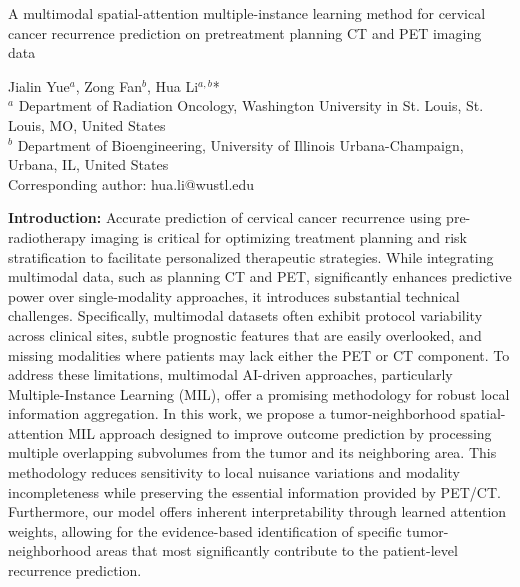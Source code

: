 \documentclass[a4paper]{article}
\begin{document}

\Large
 \begin{center}
A multimodal spatial-attention multiple-instance learning method for cervical cancer recurrence prediction on pretreatment planning CT and PET imaging data\\ 

\hspace{10pt}

\large
Jialin Yue$^{a}$, Zong Fan$^{b}$, Hua Li$^{a,b}$*\\
\normalsize
$^{a}$ Department of Radiation Oncology, Washington University in St. Louis, St. Louis, MO, United States\\
$^{b}$ Department of Bioengineering, University of Illinois Urbana-Champaign, Urbana, IL, United States\\
\footnotesize *Corresponding author: hua.li@wustl.edu

\hspace{10pt}



\end{center}

\hspace{10pt}

\textbf{Introduction:} Accurate prediction of cervical cancer recurrence using pre-radiotherapy imaging is critical for optimizing treatment planning and risk stratification to facilitate personalized therapeutic strategies. 
While integrating multimodal data, such as planning CT and PET, significantly enhances predictive power over single-modality approaches, it introduces substantial technical challenges. 
Specifically, multimodal datasets often exhibit protocol variability across clinical sites, subtle prognostic features that are easily overlooked, and missing modalities where patients may lack either the PET or CT component.
To address these limitations, multimodal AI-driven approaches, particularly Multiple-Instance Learning (MIL), offer a promising methodology for robust local information aggregation. 
In this work, we propose a tumor-neighborhood spatial-attention MIL approach designed to improve outcome prediction by processing multiple overlapping subvolumes from the tumor and its neighboring area. 
This methodology reduces sensitivity to local nuisance variations and modality incompleteness while preserving the essential information provided by PET/CT. 
Furthermore, our model offers inherent interpretability through learned attention weights, allowing for the evidence-based identification of specific tumor-neighborhood areas that most significantly contribute to the patient-level recurrence prediction.
\end{document}
